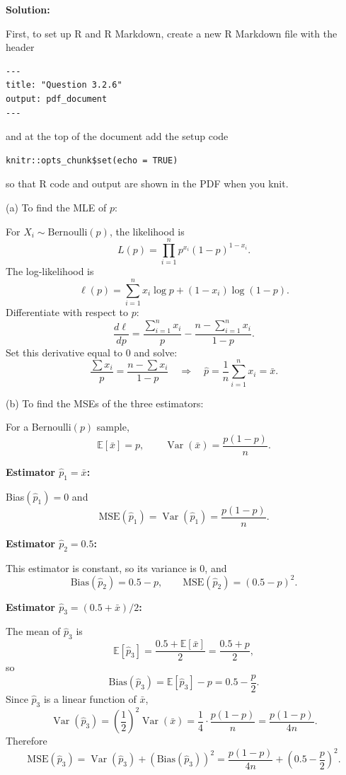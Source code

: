 \documentclass[11pt,letterpaper]{article}
\theoremstyle{remark}
\begin{document}
\vspace{1cm}

\textbf{Solution:}

First, to set up R and R Markdown, create a new R Markdown file with the header

\begin{verbatim}
---
title: "Question 3.2.6"
output: pdf_document
---
\end{verbatim}

and at the top of the document add the setup code

\begin{verbatim}
knitr::opts_chunk$set(echo = TRUE)
\end{verbatim}

so that R code and output are shown in the PDF when you knit.

\medskip
(a) To find the MLE of $p$:

For $X_i \sim \text{Bernoulli}(p)$, the likelihood is
\[
L(p) = \prod_{i=1}^n p^{x_i}(1-p)^{1-x_i}.
\]
The log-likelihood is
\[
\ell(p) = \sum_{i=1}^n x_i \log p + (1-x_i)\log(1-p).
\]
Differentiate with respect to $p$:
\[
\frac{d\ell}{dp} = \frac{\sum_{i=1}^n x_i}{p} - \frac{n-\sum_{i=1}^n x_i}{1-p}.
\]
Set this derivative equal to $0$ and solve:
\[
\frac{\sum x_i}{p} = \frac{n-\sum x_i}{1-p}
\quad\Rightarrow\quad
\boxed{\hat{p} = \frac{1}{n}\sum_{i=1}^n x_i = \bar{x}}.
\]

\medskip
(b) To find the MSEs of the three estimators:

For a Bernoulli$(p)$ sample,
\[
\mathbb{E}[\bar{x}] = p, \qquad \operatorname{Var}(\bar{x}) = \frac{p(1-p)}{n}.
\]

\textbf{Estimator $\hat{p}_1 = \bar{x}$:}

Bias$(\hat{p}_1) = 0$ and
\[
\boxed{\text{MSE}(\hat{p}_1) = \operatorname{Var}(\hat{p}_1) = \frac{p(1-p)}{n}}.
\]

\textbf{Estimator $\hat{p}_2 = 0.5$:}

This estimator is constant, so its variance is $0$, and
\[
\text{Bias}(\hat{p}_2) = 0.5 - p,
\qquad
\boxed{\text{MSE}(\hat{p}_2) = (0.5 - p)^2}.
\]

\textbf{Estimator $\hat{p}_3 = (0.5 + \bar{x})/2$:}

The mean of $\hat{p}_3$ is
\[
\mathbb{E}[\hat{p}_3] = \frac{0.5 + \mathbb{E}[\bar{x}]}{2}
= \frac{0.5 + p}{2},
\]
so
\[
\text{Bias}(\hat{p}_3) = \mathbb{E}[\hat{p}_3] - p = 0.5 - \frac{p}{2}.
\]
Since $\hat{p}_3$ is a linear function of $\bar{x}$,
\[
\operatorname{Var}(\hat{p}_3) = \left(\frac{1}{2}\right)^2 \operatorname{Var}(\bar{x})
= \frac{1}{4}\cdot \frac{p(1-p)}{n}
= \frac{p(1-p)}{4n}.
\]
Therefore
\[
\boxed{\text{MSE}(\hat{p}_3)
= \operatorname{Var}(\hat{p}_3) + (\text{Bias}(\hat{p}_3))^2
= \frac{p(1-p)}{4n} + \left(0.5 - \frac{p}{2}\right)^2}.
\]
\end{document}
